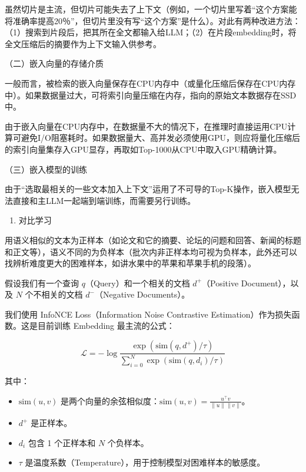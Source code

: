 虽然切片是主流，但切片可能失去了上下文（例如，一个切片里写着``这个方案能将准确率提高20％''，但切片里没有写``这个方案''是什么）。对此有两种改进方法：（1）搜索到片段后，把其所在全文都输入给LLM；（2）在片段embedding时，将全文压缩后的摘要作为上下文输入供参考。

（二）嵌入向量的存储介质

一般而言，被检索的嵌入向量保存在CPU内存中（或量化压缩后保存在CPU内存中）。如果数据量过大，可将索引向量压缩在内存，指向的原始文本数据存在SSD中。

由于嵌入向量在CPU内存中，在数据量不大的情况下，在推理时直接运用CPU计算可避免I/O阻塞耗时。如果数据量大、高并发必须使用GPU，则应将量化压缩后的索引向量集存入GPU显存，再取如Top-1000从CPU中取入GPU精确计算。

（三）嵌入模型的训练

由于``选取最相关的一些文本加入上下文''运用了不可导的Top-K操作，嵌入模型无法直接和主LLM一起端到端训练，而需要另行训练。

\begin{enumerate}
\def\labelenumi{\arabic{enumi}.}
\tightlist
\item
  对比学习
\end{enumerate}

用语义相似的文本为正样本（如论文和它的摘要、论坛的问题和回答、新闻的标题和正文等），语义不同的为负样本（批次内非正样本均可视为负样本，此外还可以找辨析难度更大的困难样本，如讲水果中的苹果和苹果手机的段落）。

假设我们有一个查询 \(q\)（Query）和一个相关的文档 \(d^+\)（Positive Document），以及 \(N\) 个不相关的文档 \(d^-\)（Negative Documents）。

我们使用 InfoNCE Loss（Information Noise Contrastive Estimation）作为损失函数。这是目前训练 Embedding 最主流的公式：

\[
\mathcal{L}=-\log\frac{\exp(\mathrm{sim}(q,d^+)/\tau)}{\sum_{i=0}^{N}\exp(\mathrm{sim}(q,d_i)/\tau)}
\]

其中：

\begin{itemize}
\tightlist
\item
  \(\mathrm{sim}(u,v)\) 是两个向量的余弦相似度：\(\mathrm{sim}(u,v)=\frac{u^\top v}{\lVert u\rVert\lVert v\rVert}\)。
\item
  \(d^+\) 是正样本。
\item
  \(d_i\) 包含 1 个正样本和 \(N\) 个负样本。
\item
  \(\tau\) 是温度系数（Temperature），用于控制模型对困难样本的敏感度。
\end{itemize}

